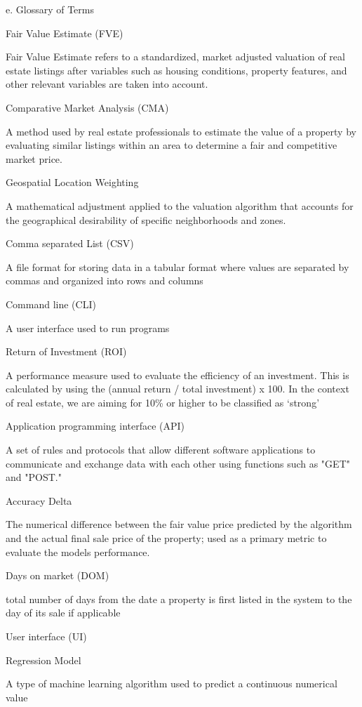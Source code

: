 \documentclass[
]{article}
\begin{document}
e. Glossary of Terms

Fair Value Estimate (FVE)

Fair Value Estimate refers to a standardized, market adjusted valuation
of real estate listings after variables such as housing conditions,
property features, and other relevant variables are taken into account.

Comparative Market Analysis (CMA)

A method used by real estate professionals to estimate the value of a
property by evaluating similar listings within an area to determine a
fair and competitive market price.

Geospatial Location Weighting

A mathematical adjustment applied to the valuation algorithm that
accounts for the geographical desirability of specific neighborhoods and
zones.

Comma separated List (CSV)

A file format for storing data in a tabular format where values are
separated by commas and organized into rows and columns

Command line (CLI)

A user interface used to run programs

Return of Investment (ROI)

A performance measure used to evaluate the efficiency of an investment.
This is calculated by using the (annual return / total investment) x
100. In the context of real estate, we are aiming for 10\% or higher to
be classified as `strong'

Application programming interface (API)

A set of rules and protocols that allow different software applications
to communicate and exchange data with each other using functions such as
"GET" and "POST."

Accuracy Delta

The numerical difference between the fair value price predicted by the
algorithm and the actual final sale price of the property; used as a
primary metric to evaluate the model\textquotesingle s performance.

Days on market (DOM)

total number of days from the date a property is first listed in the
system to the day of its sale if applicable

User interface (UI)

Regression Model

A type of machine learning algorithm used to predict a continuous
numerical value
\end{document}
